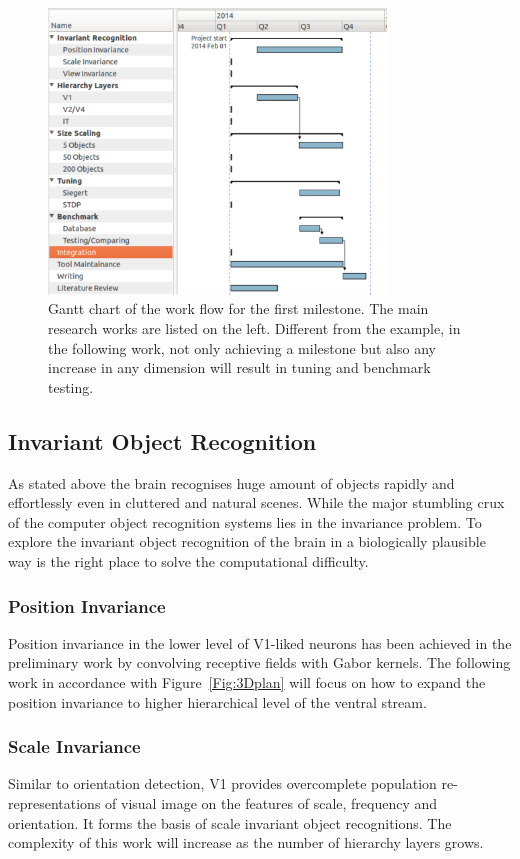 \begin{figure}[h!]
	\centering
	\includegraphics[width=0.8\textwidth]{pics/gantt.pdf}
	\caption{Gantt chart of the work flow for the first milestone.
	The main research works are listed on the left.
	Different from the example, in the following work, not only achieving a milestone but also any increase in any dimension will result in tuning and benchmark testing.}
	\label{Fig:gantt}
\end{figure}
\subsection{Invariant Object Recognition}
As stated above the brain recognises huge amount of objects rapidly and effortlessly even in cluttered and natural scenes.
While the major stumbling crux of the computer object recognition systems lies in the invariance problem.
To explore the invariant object recognition of the brain in a biologically plausible way is the right place to solve the computational difficulty.
\subsubsection{Position Invariance}
Position invariance in the lower level of V1-liked neurons has been achieved in the preliminary work by convolving receptive fields with Gabor kernels.
The following work in accordance with Figure~\ref{Fig:3Dplan} will focus on how to expand the position invariance to higher hierarchical level of the ventral stream.
\subsubsection{Scale Invariance}
Similar to orientation detection, V1 provides overcomplete population re-representations of visual image on the features of scale, frequency and orientation.
It forms the basis of scale invariant object recognitions.
The complexity of this work will increase as the number of hierarchy layers grows.
